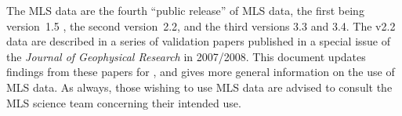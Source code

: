 \documentclass[11pt,draft]{report}
\begin{document}
The \thisv MLS data are the fourth ``public release'' of MLS data, the
first being version~1.5 \citep{EOSMLSV15Quality}, the second
version~2.2, and the third versions 3.3 and 3.4.  The v2.2 data are
described in a series of validation papers published in a special issue
of the \emph{Journal of Geophysical Research} in 2007/2008.  This
document updates findings from these papers for \thisv, and gives more
general information on the use of MLS data.  As always, those wishing to
use MLS data are advised to consult the MLS science team concerning
their intended use.

%
\newenvironment{tablenotes}{%
  \begin{list}{}{%
      \renewcommand{\makelabel}[1]{##1}%
      \setlength{\itemsep}{0.5ex}%
      \setlength{\topsep}{0.5ex}%
      \setlength{\parskip}{0pt}%
      \setlength{\partopsep}{0pt}%
      \setlength{\parsep}{0pt}%
      \setlength{\itemindent}{0em}%
      \setlength{\leftmargin}{1.5em}%
      \setlength{\labelwidth}{1.5em}%
      \setlength{\labelsep}{0pt}%
    }}%
  {\end{list}}
\newcommand{\tabnudge}[1]{\smash{\raisebox{1.4ex}{#1}}}
%
\end{document}
